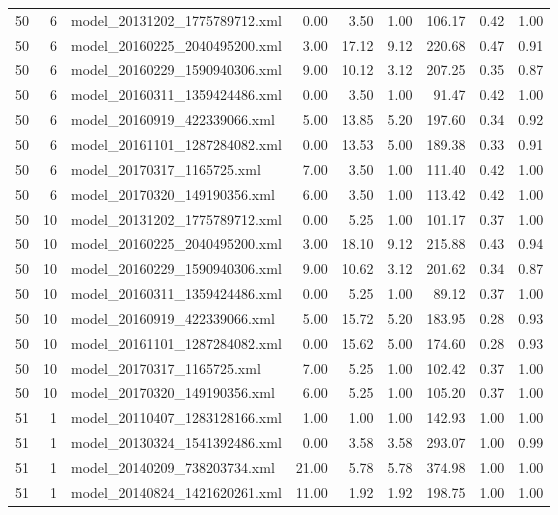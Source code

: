 \begin{table}[ht]
\begin{tabular}{rrlrrrrrr}
   50 &   6 & model\_20131202\_1775789712.xml & 0.00 & 3.50 & 1.00 & 106.17 & 0.42 & 1.00 \\ 
   50 &   6 & model\_20160225\_2040495200.xml & 3.00 & 17.12 & 9.12 & 220.68 & 0.47 & 0.91 \\ 
   50 &   6 & model\_20160229\_1590940306.xml & 9.00 & 10.12 & 3.12 & 207.25 & 0.35 & 0.87 \\ 
   50 &   6 & model\_20160311\_1359424486.xml & 0.00 & 3.50 & 1.00 & 91.47 & 0.42 & 1.00 \\ 
   50 &   6 & model\_20160919\_422339066.xml & 5.00 & 13.85 & 5.20 & 197.60 & 0.34 & 0.92 \\ 
   50 &   6 & model\_20161101\_1287284082.xml & 0.00 & 13.53 & 5.00 & 189.38 & 0.33 & 0.91 \\ 
   50 &   6 & model\_20170317\_1165725.xml & 7.00 & 3.50 & 1.00 & 111.40 & 0.42 & 1.00 \\ 
   50 &   6 & model\_20170320\_149190356.xml & 6.00 & 3.50 & 1.00 & 113.42 & 0.42 & 1.00 \\ 
   50 &  10 & model\_20131202\_1775789712.xml & 0.00 & 5.25 & 1.00 & 101.17 & 0.37 & 1.00 \\ 
   50 &  10 & model\_20160225\_2040495200.xml & 3.00 & 18.10 & 9.12 & 215.88 & 0.43 & 0.94 \\ 
   50 &  10 & model\_20160229\_1590940306.xml & 9.00 & 10.62 & 3.12 & 201.62 & 0.34 & 0.87 \\ 
   50 &  10 & model\_20160311\_1359424486.xml & 0.00 & 5.25 & 1.00 & 89.12 & 0.37 & 1.00 \\ 
   50 &  10 & model\_20160919\_422339066.xml & 5.00 & 15.72 & 5.20 & 183.95 & 0.28 & 0.93 \\ 
   50 &  10 & model\_20161101\_1287284082.xml & 0.00 & 15.62 & 5.00 & 174.60 & 0.28 & 0.93 \\ 
   50 &  10 & model\_20170317\_1165725.xml & 7.00 & 5.25 & 1.00 & 102.42 & 0.37 & 1.00 \\ 
   50 &  10 & model\_20170320\_149190356.xml & 6.00 & 5.25 & 1.00 & 105.20 & 0.37 & 1.00 \\ 
   51 &   1 & model\_20110407\_1283128166.xml & 1.00 & 1.00 & 1.00 & 142.93 & 1.00 & 1.00 \\ 
   51 &   1 & model\_20130324\_1541392486.xml & 0.00 & 3.58 & 3.58 & 293.07 & 1.00 & 0.99 \\ 
   51 &   1 & model\_20140209\_738203734.xml & 21.00 & 5.78 & 5.78 & 374.98 & 1.00 & 1.00 \\ 
   51 &   1 & model\_20140824\_1421620261.xml & 11.00 & 1.92 & 1.92 & 198.75 & 1.00 & 1.00 \\ 

\end{tabular}
\end{table}
